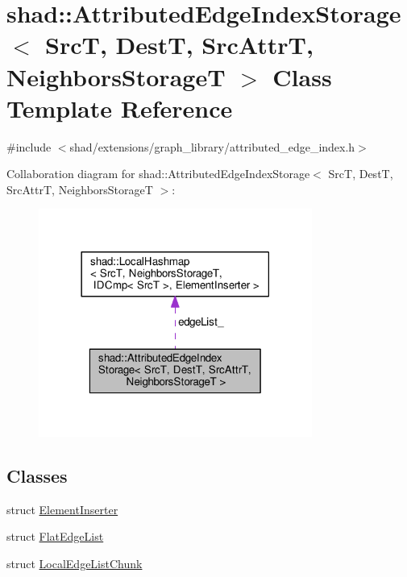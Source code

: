 \hypertarget{classshad_1_1AttributedEdgeIndexStorage}{\section{shad\-:\-:Attributed\-Edge\-Index\-Storage$<$ Src\-T, Dest\-T, Src\-Attr\-T, Neighbors\-Storage\-T $>$ Class Template Reference}
\label{classshad_1_1AttributedEdgeIndexStorage}
}


{\ttfamily \#include $<$shad/extensions/graph\-\_\-library/attributed\-\_\-edge\-\_\-index.\-h$>$}



Collaboration diagram for shad\-:\-:Attributed\-Edge\-Index\-Storage$<$ Src\-T, Dest\-T, Src\-Attr\-T, Neighbors\-Storage\-T $>$\-:
\nopagebreak
\begin{figure}[H]
\begin{center}
\leavevmode
\includegraphics[width=254pt]{classshad_1_1AttributedEdgeIndexStorage__coll__graph}
\end{center}
\end{figure}
\subsection*{Classes}
\begin{DoxyCompactItemize}
\item 
struct \hyperlink{structshad_1_1AttributedEdgeIndexStorage_1_1ElementInserter}{Element\-Inserter}
\item 
struct \hyperlink{structshad_1_1AttributedEdgeIndexStorage_1_1FlatEdgeList}{Flat\-Edge\-List}
\item 
struct \hyperlink{structshad_1_1AttributedEdgeIndexStorage_1_1LocalEdgeListChunk}{Local\-Edge\-List\-Chunk}
\end{DoxyCompactItemize}

